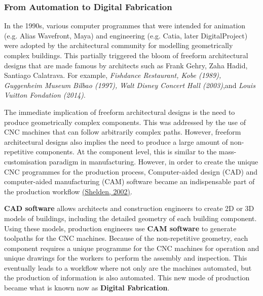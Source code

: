 \documentclass[11pt]{book}
\begin{document}
\subsubsection{From Automation to Digital Fabrication}

In the 1990s, various computer programmes that were intended for animation (e.g. Alias Wavefront, Maya) and engineering (e.g. Catia, later DigitalProject) were adopted by the architectural community for modelling geometrically complex buildings. This partially triggered the bloom of freeform architectural designs that are made famous by architects such as Frank Gehry, Zaha Hadid, Santiago Calatrava. For example, \textit{Fishdance Restaurant, Kobe (1989),  Guggenheim Museum Bilbao (1997), Walt Disney Concert Hall (2003)},and \textit{ Louis Vuitton Fondation (2014)}.\textit{ }

The immediate implication of freeform architectural designs is the need to produce geometrically complex components. This was addressed by the use of CNC machines that can follow arbitrarily complex paths. However, freeform architectural designs also implies the need to produce a large amount of non-repetitive components. At the component level, this is similar to the mass-customisation paradigm in manufacturing. However, in order to create the unique CNC programmes for the production process, Computer-aided design (CAD) and computer-aided manufacturing (CAM) software became an indispensable part of the production workflow \href{https://www.zotero.org/google-docs/?1igbdo}{(Shelden, 2002)}. 

\textbf{CAD software} allows architects and construction engineers to create 2D or 3D models of buildings, including the detailed geometry of each building component. Using these models, production engineers use \textbf{CAM software} to generate toolpaths for the CNC machines. Because of the non-repetitive geometry, each component requires a unique programme for the CNC machines for operation and unique drawings for the workers to perform the assembly and inspection. This eventually leads to a workflow where not only are the machines automated, but the production of information is also automated. This new mode of production became what is known now as \textbf{Digital Fabrication}.
\end{document}
